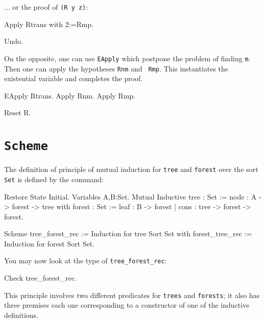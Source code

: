 \begin{coq_example*}
... or the proof of {\tt (R y z)}:

\begin{coq_example}
Apply Rtrans with 2:=Rmp.
\end{coq_example}

\begin{coq_eval}
  Undo.
\end{coq_eval}

On the opposite, one can use {\tt EApply} which postpone the problem
of finding {\tt m}. Then one can apply the hypotheses {\tt Rnm} and {\tt
Rmp}. This instantiates the existential variable and completes the proof.

\begin{coq_example}
EApply Rtrans.
Apply Rnm.
Apply Rmp.
\end{coq_example}

\begin{coq_eval}
  Reset R.
\end{coq_eval}

\section{{\tt Scheme}}
\label{Scheme-examples}

\firstexample
{}

The definition of principle of mutual induction for {\tt tree} and
{\tt forest} over the sort {\tt Set} is defined by the command:

\begin{coq_eval}
Restore State Initial.
Variables A,B:Set.
Mutual Inductive tree : Set :=  node : A -> forest -> tree
with forest : Set := leaf : B -> forest 
                   | cons : tree -> forest -> forest.
\end{coq_eval}

\begin{coq_example*}
Scheme tree_forest_rec := Induction for tree Sort Set 
with forest_tree_rec := Induction for forest Sort Set.
\end{coq_example*}

You may now look at the type of {\tt tree\_forest\_rec}:

\begin{coq_example}
Check tree_forest_rec.
\end{coq_example}

This principle involves two different predicates for {\tt trees} and
{\tt forests}; it also has three premises each one corresponding to a
constructor of one of the inductive definitions.


\end{coq_example*}
